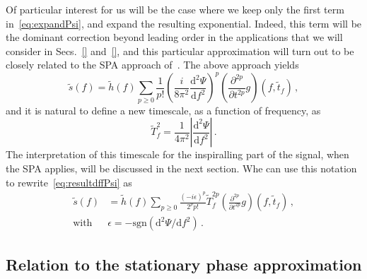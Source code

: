 \documentclass[aps,showpacs,%
prd,superscriptaddress,nofootinbib]{revtex4}
\newcommand{\be}{\begin{equation}}
\newcommand{\ee}{\end{equation}}
\newcommand\ud{{\mathrm{d}}}
\newcommand{\nn}{\nonumber}
\newcommand{\tf}{\tilde{t}_{f}}
\newcommand{\Tf}{\tilde{T}_{f}}
\begin{document}
Of particular interest for us will be the case where we keep only the first term in~\eqref{eq:expandPsi}, and expand the resulting exponential. Indeed, this term will be  the dominant correction beyond leading order in the applications that we will consider in Secs.~\ref{} and~\ref{}, and this particular approximation will turn out to be closely related to the SPA approach of~\cite{}. The above approach yields
%
\be\label{eq:resultdffPsi}
	\tilde{s}(f) = \tilde{h}(f) \sum\limits_{p\geq 0} \frac{1}{p!} \left( \frac{i}{8\pi^{2}}\frac{\ud^{2} \Psi}{\ud f^{2}} \right)^{p} \left( \frac{\partial^{2p} }{\partial t^{2p}} g \right)(f,\tf) \,,
\ee
%
and it is natural to define a new timescale, as a function of frequency, as
%
\be\label{eq:defTf}
	\Tf^{2} = \frac{1}{4\pi^{2}}\left| \frac{\ud^{2}\Psi}{\ud f^{2}} \right| \,.
\ee
%
The interpretation of this timescale for the inspiralling part of the signal, when the SPA applies, will be discussed in the next section. Whe can use this notation to rewrite~\eqref{eq:resultdffPsi} as
%
\begin{align}\label{eq:resultdffPsiTf}
	 \tilde{s}(f) &= \tilde{h}(f) \sum\limits_{p\geq 0} \frac{(-i\epsilon)^{p}}{2^{p}p!} \Tf^{2p} \left( \frac{\partial^{2p} }{\partial t^{2p}} g \right)(f,\tf) \,, \nn \\
	 \text{with } & \epsilon = -\mathrm{sgn}(\ud^{2}\Psi/\ud f^{2} ) \,.
\end{align}
%


\subsection{Relation to the stationary phase approximation}
\label{subsec:linkSPA}
\end{document}
